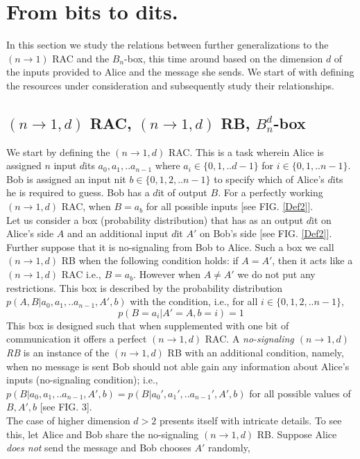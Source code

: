 \documentclass[%
 reprint,
 amsmath,amssymb,
 aps,
]{revtex4-1}
\begin{document}
\section{From bits to dits.}
In this section we study the relations between further generalizations to the $(n\rightarrow1)$ RAC and the $B_n$-box, this time around based on the dimension $d$ of the inputs provided to Alice and the message she sends. We start of with defining the resources under consideration and subsequently study their relationships.

\subsection*{$(n\rightarrow1,d)$ RAC, $(n\rightarrow1,d)$ RB, $B_n^d$-box }
\noindent We start by defining the $(n\rightarrow1,d)$ RAC. This is a task wherein  Alice is assigned $n$ input $d$its $a_0,a_1,..a_{n-1}$ where $a_i\in \{0,1,..d-1\}$ for $i\in \{0,1,..n-1\}$.  Bob is assigned an input nit $b\in\{0,1,2,..n-1\}$ to specify which of Alice's $d$its he is required to guess. Bob has a $d$it of output $B$. For a perfectly working $(n\rightarrow1,d)$ RAC, when $B=a_b$ for all possible inputs [see FIG. \ref{Def2}]. \\
Let us consider a box (probability distribution) that has as an output $d$it on Alice's side $A$ and an additional input $d$it $A'$ on Bob's side [see FIG. \ref{Def2}]. Further suppose that it is no-signaling from Bob to Alice. Such a box we call $(n\rightarrow1,d)$ RB when the following condition holds: if $A=A'$, then it acts like a $(n\rightarrow1,d)$ RAC i.e., $B=a_b$. However when $A\neq A'$ we do not put any restrictions.  This box is described by the probability distribution $p(A,B|a_0,a_1,..a_{n-1},A',b)$ with the condition, i.e., for all $i\in\{0,1,2,..n-1\}$,
\begin{equation}\label{de1}
p(B=a_i|A'=A,b=i)=1
\end{equation}
This box is designed such that when supplemented with one bit of communication it offers a perfect $(n\rightarrow1,d)$ RAC. A
\textit{no-signaling $(n\rightarrow1,d)$ RB} is an instance of the $(n\rightarrow1,d)$ RB with an additional condition, namely, when no message is sent Bob should not able gain any information about Alice's inputs (no-signaling condition); i.e., $p(B|a_0,a_1,..a_{n-1},A',b)=p(B|a_0',a_1',..a_{n-1}',A',b)$ for all possible values of $B,A',b$ [see FIG. 3]. \\
The case of higher dimension $d>2$ presents itself with intricate details. To see this, let Alice and Bob share the no-signaling $(n\rightarrow 1,d)$ RB. Suppose Alice \textit{does not} send the message and Bob chooses $A'$ randomly, 
\end{document}
